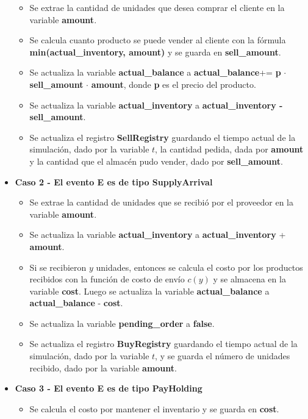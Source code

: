 \documentclass{article}
\begin{document}
\begin{itemize}
    \begin{itemize}
        \item Se extrae la cantidad de unidades que desea comprar el cliente en la variable \textbf{amount}.
        \item Se calcula cuanto producto se puede vender al cliente con la fórmula \textbf{min(actual\_inventory, amount)} y se guarda en \textbf{sell\_amount}.
        \item Se actualiza la variable \textbf{actual\_balance} a \textbf{actual\_balance}+= \textbf{p} $\cdot$ \textbf{sell\_amount} $\cdot$ \textbf{amount}, donde \textbf{p} es el precio del producto.
        \item Se actualiza la variable \textbf{actual\_inventory} a \textbf{actual\_inventory - sell\_amount}.
        \item Se actualiza el registro \textbf{SellRegistry} guardando el tiempo actual de la simulación, dado por la variable $t$, la cantidad pedida, dada por \textbf{amount} y la cantidad que el almacén pudo vender, dado por \textbf{sell\_amount}.
    \end{itemize}
    \item \textbf{Caso 2 - El evento E es de tipo SupplyArrival}
    \begin{itemize}
        \item Se extrae la cantidad de unidades que se recibió por el proveedor en la variable \textbf{amount}.
        \item Se actualiza la variable \textbf{actual\_inventory} a \textbf{actual\_inventory} + \textbf{amount}.
        \item Si se recibieron $y$ unidades, entonces se calcula el costo por los productos recibidos con la función de costo de envío $c(y)$ y se almacena en la variable \textbf{cost}. Luego se actualiza la variable \textbf{actual\_balance} a \textbf{actual\_balance} - \textbf{cost}.
        \item Se actualiza la variable \textbf{pending\_order} a \textbf{false}.
        \item Se actualiza el registro \textbf{BuyRegistry} guardando el tiempo actual de la simulación, dado por la variable $t$, y se guarda el número de unidades recibido, dado por la variable \textbf{amount}.
    \end{itemize}
    \item \textbf{Caso 3 - El evento E es de tipo PayHolding}
    \begin{itemize}
        \item Se calcula el costo por mantener el inventario y se guarda en \textbf{cost}.

\end{itemize}
\end{itemize}
\end{document}
